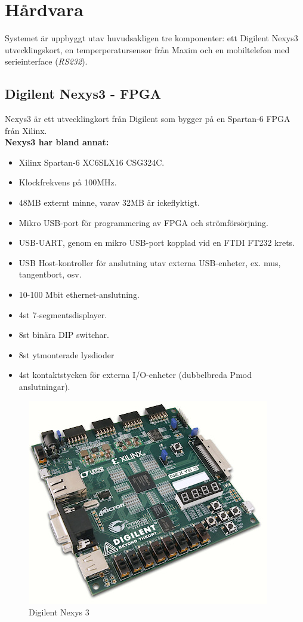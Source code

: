 \section{Hårdvara}\label{sec:hårdvara}
	Systemet är uppbyggt utav huvudsakligen tre komponenter: ett Digilent Nexys3 utvecklingskort, en
	temperperatursensor från Maxim och en mobiltelefon med serieinterface (\emph{RS232}).

	\subsection{Digilent Nexys3 - FPGA}
		Nexys3 är ett utvecklingkort från Digilent som bygger på en Spartan-6 FPGA från Xilinx.
		\\
		\textbf{Nexys3 har bland annat:}
		\begin{itemize}
			\item Xilinx Spartan-6 XC6SLX16 CSG324C.
			\item Klockfrekvens på 100MHz.
			\item 48MB externt minne, varav 32MB är ickeflyktigt.
			\item Mikro USB-port för programmering av FPGA och strömförsörjning.
			\item USB-UART, genom en mikro USB-port kopplad vid en FTDI FT232 krets.
			\item USB Host-kontroller för anslutning utav externa USB-enheter, ex. mus, tangentbort, osv.
			\item 10-100 Mbit ethernet-anslutning.
			\item 4st 7-segmentsdisplayer.
			\item 8st binära DIP switchar.
			\item 8st ytmonterade lysdioder
			\item 4st kontaktstycken för externa I/O-enheter (dubbelbreda Pmod anslutningar).
		\end{itemize}
		
\begin{figure}[htp]
	\centering
	\includegraphics[scale=0.8]{nexys3.jpg}
	\caption{Digilent Nexys 3}
\end{figure}
		
